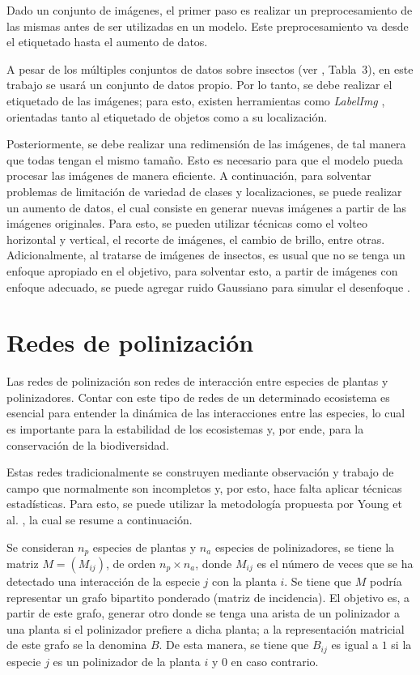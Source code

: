 Dado un conjunto de imágenes, el primer paso es realizar un preprocesamiento de las mismas antes de ser utilizadas en un modelo. Este preprocesamiento va desde el etiquetado hasta el aumento de datos.

A pesar de los múltiples conjuntos de datos sobre insectos (ver \cite{li-2021}, Tabla~3), en este trabajo se usará un conjunto de datos propio. Por lo tanto, se debe realizar el etiquetado de las imágenes; para esto, existen herramientas como \textit{LabelImg} \cite{LabelImg}, orientadas tanto al etiquetado de objetos como a su localización.

Posteriormente, se debe realizar una redimensión de las imágenes, de tal manera que todas tengan el mismo tamaño. Esto es necesario para que el modelo pueda procesar las imágenes de manera eficiente. A continuación, para solventar problemas de limitación de variedad de clases y localizaciones, se puede realizar un aumento de datos, el cual consiste en generar nuevas imágenes a partir de las imágenes originales. Para esto, se pueden utilizar técnicas como el volteo horizontal y vertical, el recorte de imágenes, el cambio de brillo, entre otras. Adicionalmente, al tratarse de imágenes de insectos, es usual que no se tenga un enfoque apropiado en el objetivo, para solventar esto, a partir de imágenes con enfoque adecuado, se puede agregar ruido Gaussiano para simular el desenfoque \cite{khanramaki-2021}.


\section{Redes de polinización}

Las redes de polinización son redes de interacción entre especies de plantas y polinizadores. Contar con este tipo de redes de un determinado ecosistema es esencial para entender la dinámica de las interacciones entre las especies, lo cual es importante para la estabilidad de los ecosistemas y, por ende, para la conservación de la biodiversidad.

Estas redes tradicionalmente se construyen mediante observación y trabajo de campo que normalmente son incompletos y, por esto, hace falta aplicar técnicas estadísticas. Para esto, se puede utilizar la metodología propuesta por Young et al. \cite{young-2021}, la cual se resume a continuación.

Se consideran $n_p$ especies de plantas y $n_a$ especies de polinizadores, se tiene la matriz $M = (M_{ij})$, de orden $n_p\times n_a$, donde $M_{ij}$ es el número de veces que se ha detectado una interacción de la especie $j$ con la planta $i$. Se tiene que $M$ podría representar un grafo bipartito ponderado (matriz de incidencia). El objetivo es, a partir de este grafo, generar otro donde se tenga una arista de un polinizador a una planta si el polinizador prefiere a dicha planta; a la representación matricial de este grafo se la denomina $B$. De esta manera, se tiene que $B_{ij}$ es igual a $1$ si la especie $j$ es un polinizador de la planta $i$ y $0$ en caso contrario.

